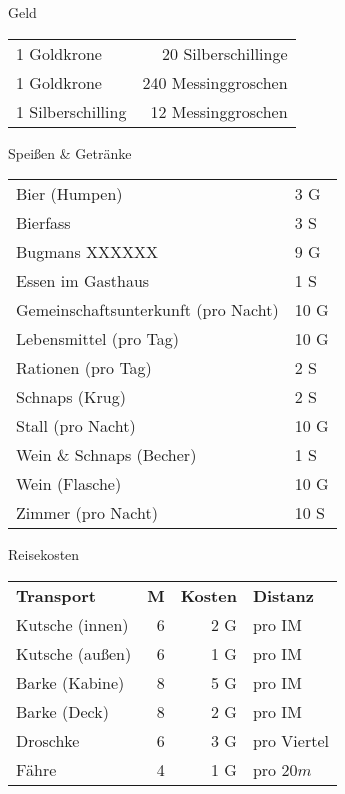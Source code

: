 \documentclass{article}
\begin{document}
\pagebreak

\begin{multicols*}{3}

    \begin{slsframe}{Geld}
        \begin{tabularx}{\linewidth}{Xr}
            1 Goldkrone & 20 Silberschillinge   \\
            1 Goldkrone    & 240 Messinggroschen   \\
            1 Silberschilling    & 12 Messinggroschen   
        \end{tabularx}
    \end{slsframe}

    \begin{slsframe}{Speißen \& Getränke}
        \begin{tabularx}{0.95\linewidth}{Xl}
            Bier (Humpen)                       & 3 G            \\ 
            Bierfass                            & 3 S            \\ 
            Bugmans XXXXXX                      & 9 G            \\ 
            Essen im Gasthaus                   & 1 S            \\ 
            Gemeinschaftsunterkunft (pro Nacht) & 10 G           \\ 
            Lebensmittel (pro Tag)              & 10 G           \\ 
            Rationen (pro Tag)                  & 2 S            \\ 
            Schnaps (Krug)                      & 2 S            \\ 
            Stall (pro Nacht)                   & 10 G           \\ 
            Wein \& Schnaps (Becher)            & 1 S            \\ 
            Wein (Flasche)                      & 10 G           \\ 
            Zimmer (pro Nacht)                  & 10 S               
        \end{tabularx}%
    \end{slsframe}

    \begin{slsframe}{Reisekosten}
        \begin{tabularx}{\linewidth}{Xrrl}
            \textbf{Transport} & \textbf{M} & \textbf{Kosten} & \textbf{Distanz} \\
            Kutsche (innen) & 6 & 2 G & pro IM  \\
            Kutsche (außen) & 6 & 1 G & pro IM  \\
            Barke (Kabine) & 8  & 5 G & pro IM  \\
            Barke (Deck) & 8    & 2 G & pro IM  \\
            Droschke & 6        & 3 G & pro Viertel  \\
            Fähre & 4           & 1 G & pro $20m$  
        \end{tabularx}
    \end{slsframe}



\end{multicols*}
\end{document}
